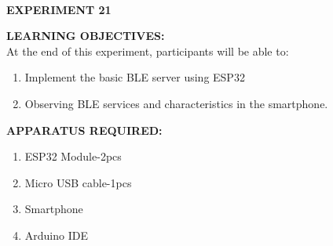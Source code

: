 \documentclass[12pt,a4paper]{article}
\begin{document}
\begin{sloppypar}

\begin{center}

\textbf{\large \\EXPERIMENT 21 }\\[6pt]
\end{center}

\textbf{\large LEARNING OBJECTIVES:}\\[3pt]
At the end of this experiment, participants will be able to:\vspace{-6mm}\begin{enumerate}
 \setlength\itemsep{-0.3em}
\item Implement the basic BLE server using ESP32 \\
\item Observing BLE services and characteristics in the smartphone.
\end{enumerate}

\textbf{\large APPARATUS REQUIRED:}\\
\vspace{-3mm}
\begin{enumerate}
 \setlength\itemsep{-0.3em}
\item ESP32 Module-2pcs 
\item Micro USB cable-1pcs
\item Smartphone
\item Arduino IDE
\end{enumerate}


\end{sloppypar}
\end{document}
